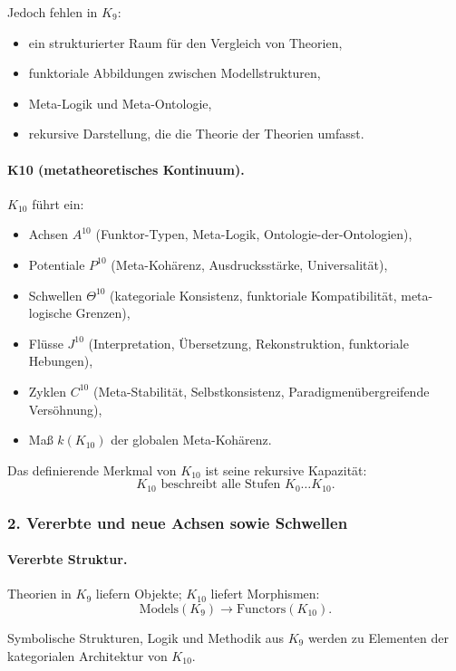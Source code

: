 Jedoch fehlen in $K_9$:
\begin{itemize}
  \item ein strukturierter Raum für den Vergleich von Theorien,
  \item funktoriale Abbildungen zwischen Modellstrukturen,
  \item Meta-Logik und Meta-Ontologie,
  \item rekursive Darstellung, die die Theorie der Theorien umfasst.
\end{itemize}

\paragraph{K10 (metatheoretisches Kontinuum).}
$K_{10}$ führt ein:
\begin{itemize}
  \item Achsen $A^{10}$ (Funktor-Typen, Meta-Logik, Ontologie-der-Ontologien),
  \item Potentiale $P^{10}$ (Meta-Kohärenz, Ausdrucksstärke, Universalität),
  \item Schwellen $\Theta^{10}$ (kategoriale Konsistenz, funktoriale
        Kompatibilität, meta-logische Grenzen),
  \item Flüsse $J^{10}$ (Interpretation, Übersetzung, Rekonstruktion,
        funktoriale Hebungen),
  \item Zyklen $C^{10}$ (Meta-Stabilität, Selbstkonsistenz,
        Paradigmenübergreifende Versöhnung),
  \item Maß $k(K_{10})$ der globalen Meta-Kohärenz.
\end{itemize}

Das definierende Merkmal von $K_{10}$ ist seine rekursive Kapazität:
\[
K_{10} \text{ beschreibt alle Stufen } K_0\dots K_{10}.
\]

\subsubsection{2. Vererbte und neue Achsen sowie Schwellen}

\paragraph{Vererbte Struktur.}
Theorien in $K_9$ liefern Objekte; $K_{10}$ liefert Morphismen:
\[
\text{Models}(K_9) \rightarrow \text{Functors}(K_{10}).
\]

Symbolische Strukturen, Logik und Methodik aus $K_9$ werden zu Elementen der
kategorialen Architektur von $K_{10}$.

